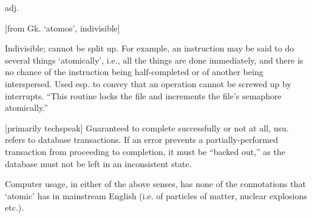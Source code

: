  adj.

[from Gk. `atomos', indivisible]
\begin{inparaenum}
	\item Indivisible; cannot be split up. For example, an instruction may be said to do several things `atomically', i.e., all the things
		are done immediately, and there is no chance of the instruction being half-completed or of another being interspersed. Used esp. to
		convey that an operation cannot be screwed up by interrupts. ``This routine locks the file and increments the file's semaphore
		atomically.''
	\item {[}primarily techspeak] Guaranteed to complete successfully or not at all, usu. refers to database transactions. If an error
		prevents a partially-performed transaction from proceeding to completion, it must be ``backed out,'' as the database must not be
		left in an inconsistent state.
\end{inparaenum}

Computer usage, in either of the above senses, has none of the connotations that `atomic' has in mainstream English (i.e. of particles of
matter, nuclear explosions etc.).

